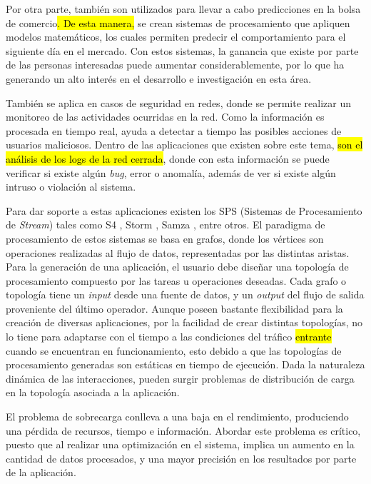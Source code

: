 Por otra parte, también son utilizados para llevar a cabo predicciones en la bolsa de comercio\hl{. De esta manera,} se crean sistemas de procesamiento que apliquen modelos matemáticos, los cuales permiten predecir el comportamiento para el siguiente día en el mercado. Con estos sistemas, la ganancia que existe por parte de las personas interesadas puede aumentar considerablemente, por lo que ha generando un alto interés en el desarrollo e investigación en esta área.

También se aplica en casos de seguridad en redes, donde se permite realizar un monitoreo de las actividades ocurridas en la red. Como la información es procesada en tiempo real, ayuda a detectar a tiempo las posibles acciones de usuarios maliciosos. Dentro de las aplicaciones que existen sobre este tema, \hl{son el análisis de los logs de la red cerrada}, donde con esta información se puede verificar si existe algún \textit{bug}, error o anomalía, además de ver si existe algún intruso o violación al sistema.

Para dar soporte a estas aplicaciones existen los SPS (Sistemas de Procesamiento de \textit{Stream}) tales como S4 \citep{s4yahoo}, Storm \citep{stormtwitter}, Samza \citep{samza}, entre otros. El paradigma de procesamiento de estos sistemas se basa en grafos, donde los vértices son operaciones realizadas al flujo de datos, representadas por las distintas aristas. Para la generación de una aplicación, el usuario debe diseñar una topología de procesamiento compuesto por las tareas u operaciones deseadas. Cada grafo o topología tiene un \textit{input} desde una fuente de datos, y un \textit{output} del flujo de salida proveniente del último operador. Aunque poseen bastante flexibilidad para la creación de diversas aplicaciones, por la facilidad de crear distintas topologías, no lo tiene para adaptarse con el tiempo a las condiciones del tráfico \hl{entrante} cuando se encuentran en funcionamiento, esto debido a que las topolog\'ias de procesamiento generadas son est\'aticas en tiempo de ejecución. Dada la naturaleza din\'amica de las interacciones, pueden surgir problemas de distribución de carga en la topología asociada a la aplicación.

El problema de sobrecarga conlleva a una baja en el rendimiento, produciendo una pérdida de recursos, tiempo e información. Abordar este problema es crítico, puesto que al realizar una optimización en el sistema, implica un aumento en la cantidad de datos procesados, y una mayor precisión en los resultados por parte de la aplicación.

